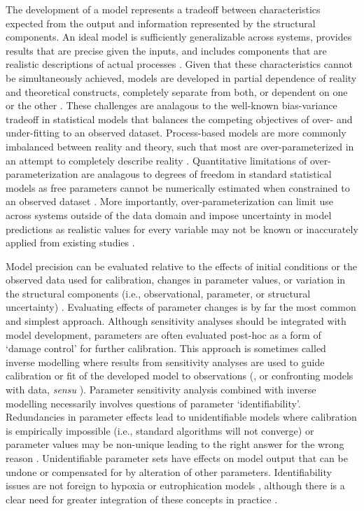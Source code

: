 \documentclass[preprint]{elsarticle}\usepackage[]{graphicx}\usepackage[]{color}
\begin{document}
The development of a model represents a tradeoff between characteristics expected from the output and information represented by the structural components. An ideal model is sufficiently generalizable across systems, provides results that are precise given the inputs, and includes components that are realistic descriptions of actual processes \citep{Levins66}. Given that these characteristics cannot be simultaneously achieved, models are developed in partial dependence of reality and theoretical constructs, completely separate from both, or dependent on one or the other \citep{Morrison99,Ganju16}.  These challenges are analagous to the well-known bias-variance tradeoff in statistical models that balances the competing objectives of over- and under-fitting to an observed dataset. Process-based models are more commonly imbalanced between reality and theory, such that most are over-parameterized in an attempt to completely describe reality \citep{Denman03,Nossent12,Petrucci14}.  Quantitative limitations of over-parameterization are analagous to degrees of freedom in standard statistical models as free parameters cannot be numerically estimated when constrained to an observed dataset \citep{Kirchner06}.  More importantly, over-parameterization can limit use across systems outside of the data domain and impose uncertainty in model predictions as realistic values for every variable may not be known or inaccurately applied from existing studies \citep{Durand02,Refsgaard07,Wade08}.

Model precision can be evaluated relative to the effects of initial conditions or the observed data used for calibration, changes in parameter values, or variation in the structural components (i.e., observational, parameter, or structural uncertainty) \citep{Beck87}.  Evaluating effects of parameter changes is by far the most common and simplest approach.  Although sensitivity analyses should be integrated with model development, parameters are often evaluated post-hoc as a form of `damage control' for further calibration.  This approach is sometimes called inverse modelling where results from sensitivity analyses are used to guide calibration or fit of the developed model to observations (\citealt{Soetaert10}, or confronting models with data, \textit{sensu} \citealt{Hilborn97}).  Parameter sensitivity analysis combined with inverse modelling necessarily involves questions of parameter `identifiability'.  Redundancies in parameter effects lead to unidentifiable models where calibration is empirically impossible (i.e., standard algorithms will not converge) or parameter values may be non-unique leading to the right answer for the wrong reason \citep{Kirchner06}. Unidentifiable parameter sets have effects on model output that can be undone or compensated for by alteration of other parameters.  Identifiability issues are not foreign to hypoxia or eutrophication models  \citep{Omlin01,Estrada10,Mateus15}, although there is a clear need for greater integration of these concepts in practice \citep{Fasham06}.
\end{document}
